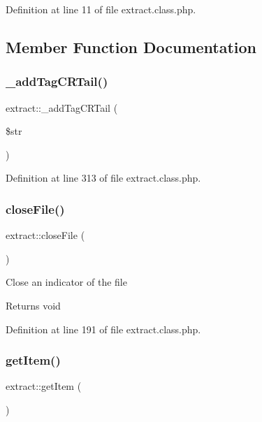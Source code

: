 Definition at line 11 of file extract.\+class.\+php.



\subsection{Member Function Documentation}
\hypertarget{classextract_a77e98fbf711e5b4e456e1e5316e8132f}{}\label{classextract_a77e98fbf711e5b4e456e1e5316e8132f} 
\subsubsection{\texorpdfstring{\+\_\+add\+Tag\+C\+R\+Tail()}{\_addTagCRTail()}}
{\footnotesize\ttfamily extract\+::\+\_\+add\+Tag\+C\+R\+Tail (\begin{DoxyParamCaption}\item[{}]{\$str }\end{DoxyParamCaption})}



Definition at line 313 of file extract.\+class.\+php.

\hypertarget{classextract_a6f2e15680bdecf195711ac7e6663be6f}{}\label{classextract_a6f2e15680bdecf195711ac7e6663be6f} 
\subsubsection{\texorpdfstring{close\+File()}{closeFile()}}
{\footnotesize\ttfamily extract\+::close\+File (\begin{DoxyParamCaption}{ }\end{DoxyParamCaption})}

Close an indicator of the file \begin{DoxyReturn}{Returns}
void 
\end{DoxyReturn}


Definition at line 191 of file extract.\+class.\+php.

\hypertarget{classextract_ab134fd86ba681c1035d3d9961b4d305a}{}\label{classextract_ab134fd86ba681c1035d3d9961b4d305a} 
\subsubsection{\texorpdfstring{get\+Item()}{getItem()}}
{\footnotesize\ttfamily extract\+::get\+Item (\begin{DoxyParamCaption}{ }\end{DoxyParamCaption})}

